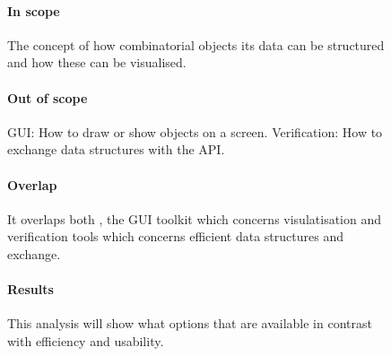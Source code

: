 \begin{figure}[!h]
{\begin{boxedminipage}[b]{.32\textwidth}
{	    \paragraph{In scope}
	    The concept of how combinatorial objects its data can be structured and how these can be visualised.
	    \paragraph{Out of scope}
	    GUI: How to draw or show objects on a screen.
	    Verification: How to exchange data structures with the API.
	    \paragraph{Overlap}
	    It overlaps both , the GUI toolkit which concerns visulatisation and verification tools which concerns efficient data structures and exchange.
	    \paragraph{Results}
	    This analysis will show what options that are available in contrast with efficiency and usability.
	}%
    \end{boxedminipage}
    }%
\end{figure}
